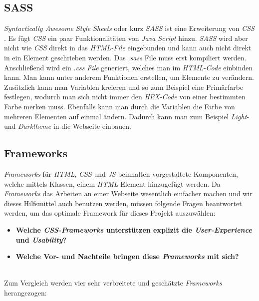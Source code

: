 	\subsection{SASS}
	\label{chapter:study-frontend-sass}
	\textit{Syntactically Awesome Style Sheets} oder kurz \textit{SASS} ist eine Erweiterung von \textit{CSS} \cite{jump-start-sass}. Es fügt \textit{CSS} ein paar Funktionalitäten von \textit{Java Script} hinzu. \textit{SASS} wird aber nicht wie \textit{CSS} direkt in das \textit{HTML-File} eingebunden und kann auch nicht direkt in ein Element geschrieben werden. Das \textit{.sass} File muss erst kompiliert werden. Anschließend wird ein \textit{.css} \textit{File} generiert, welches man im \textit{HTML-Code} einbinden kann. Man kann unter anderem Funktionen erstellen, um Elemente zu verändern. Zusätzlich kann man Variablen kreieren und so zum Beispiel eine Primärfarbe festlegen, wodurch man sich nicht immer den \textit{HEX-Code} von einer bestimmten Farbe merken muss. Ebenfalls kann man durch die Variablen die Farbe von mehreren Elementen auf einmal ändern. Dadurch kann man zum Beispiel \textit{Light}- und \textit{Darktheme} in die Webseite einbauen.

	
	
	\subsection{Frameworks}
	\label{chapter:study-frontend-frameworks}
	\textit{Frameworks} für \textit{HTML}, \textit{CSS} und \textit{JS} beinhalten vorgestaltete Komponenten, welche mittels Klassen, einem \textit{HTML} Element hinzugefügt werden. Da \textit{Frameworks} das Arbeiten an einer Webseite wesentlich einfacher machen und wir dieses Hilfsmittel auch benutzen werden, müssen folgende Fragen beantwortet werden, um das optimale Framework für dieses Projekt auszuwählen:
	\begin{itemize}
		\item \textbf{Welche \textit{CSS-Frameworks} unterstützen explizit die \textit{User-Experience} und \textit{Usability}?}
		\item \textbf{Welche Vor- und Nachteile bringen diese \textit{Frameworks} mit sich?}
	\end{itemize}
\label{list:fragenframeworks} ~\\
	Zum Vergleich werden vier sehr verbreitete und geschätzte \textit{Frameworks} herangezogen:
